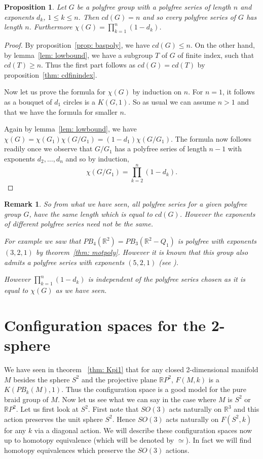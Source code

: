 \documentclass{amsart}
\newtheorem{prop}[thm]{Proposition}
\newtheorem{rem}[thm]{Remark}
\begin{document}
\begin{prop}
Let $G$ be a polyfree group with a polyfree series of length $n$
and exponents $d_k$, $1 \leq k \leq n$.
Then $cd(G)=n$ and so every polyfree series of $G$ has length $n$.
Furthermore $\chi(G)=\prod_{k=1}^n(1-d_k)$.
\end{prop}
\begin{proof}
By proposition~\ref{prop: baspoly}, we have $cd(G) \leq n$.
On the other hand, by lemma~\ref{lem: lowbound}, we have a subgroup $T$ of
$G$ of finite index, such that $cd(T) \geq n$. Thus the first
part follows as $cd(G)=cd(T)$ by proposition~\ref{thm: cdfinindex}.

Now let us prove the formula for $\chi(G)$ by induction on $n$. For $n=1$,
it follows as a bouquet of $d_1$ circles is a $K(G,1)$. So as usual we
can assume $n>1$ and that we have the formula for smaller $n$.

 Again by lemma~\ref{lem: lowbound}, we have
$\chi(G) = \chi(G_1)\chi(G/G_1) = (1-d_1)\chi(G/G_1)$.
The formula now follows readily once we observe that $G/G_1$ has a polyfree
series of length $n-1$ with exponents $d_2,\dots,d_n$ and so by induction,
$$
\chi(G/G_1)=\prod_{k=2}^n(1-d_k).
$$
\end{proof}
 
\begin{rem}
So from what we have seen, all polyfree series for a given polyfree
group $G$, have the same length which is equal to $cd(G)$. However
the exponents of different polyfree series need not be the same.

For example we saw that $PB_4(\mathbb{R}^2)=PB_3(\mathbb{R}^2 - Q_1)$
is polyfree with exponents $(3,2,1)$ by theorem~\ref{thm: motpoly}.
However it is known that this group also admits a polyfree series with
exponents $(5,2,1)$ (see \cite{Dan}).

However $\prod_{k=1}^n(1-d_k)$ is independent of the polyfree series chosen
as it is equal to $\chi(G)$ as we have seen. 
\end{rem}

\section{Configuration spaces for the 2-sphere}
	We have seen in theorem ~\ref{thm: Kpi1} 
that for any closed 2-dimensional manifold $M$ besides
the sphere $S^2$ and the projective plane $\mathbb{R}P^2$, $F(M,k)$
is a $K(PB_k(M),1)$. Thus the configuration space is a good model
for the pure braid group of $M$.
	Now let us see what we can say in the case where $M$ is $S^2$ or
$\mathbb{R}P^2$.  
 	Let us first look at $S^2$. First note that $SO(3)$ acts naturally
on $\mathbb{R}^3$ and this action preserves the unit sphere $S^2$. 
Hence $SO(3)$ acts naturally on $F(S^2,k)$ for any $k$ via a diagonal action.
We will describe these configuration spaces now up to 
homotopy equivalence (which will be denoted by $\simeq$).
In fact we will find homotopy equivalences which preserve the $SO(3)$ actions.
\end{document}
